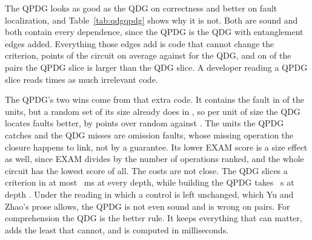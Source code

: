 The QPDG looks as good as the QDG on correctness and better on fault localization, and Table~\ref{tab:qdgqpdg} shows
why it is not. Both are sound and both contain every dependence, since the QPDG is the QDG with entanglement edges
added. Everything those edges add is code that cannot change the criterion, \numYzExcess{} points of the circuit on
average against \numLcExcess{} for the QDG, and on \numNestQpdgLarger{} of the \numNPairs{} pairs the QPDG slice is
larger than the QDG slice. A developer reading a QPDG slice reads \numYzLcExcessRatio{} times as much irrelevant code.

The QPDG's two wins come from that extra code. It contains the fault in \numRqThreeContainYz{} of the units, but a
random set of its size already does in \numSizeCtlYzRandom{}, so per unit of size the QDG locates faults better, by
\numSizeCtlLcGain{} points over random against \numSizeCtlYzGain{}. The \numLcMissYzContained{} units the QPDG catches
and the QDG misses are omission faults, whose missing operation the closure happens to link, not by a guarantee. Its
lower EXAM score is a size effect as well, since EXAM divides by the number of operations ranked, and the whole circuit
has the lowest score of all. The costs are not close. The QDG slices a criterion in at most \numCostLcMaxCritMs{}~ms at
every depth, while building the QPDG takes \numCostBuildDepthOneSixty{}~s at depth \numCostMeasuredDepthOneSixty{}. Under the reading in which a
control is left unchanged, which Yu and Zhao's prose allows, the QPDG is not even sound and is wrong on
\numYzRoUnsound{} pairs. For comprehension the QDG is the better rule. It keeps everything that can matter, adds the
least that cannot, and is computed in milliseconds.
